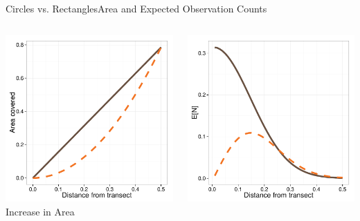 \documentclass{beamer}
\begin{document}
\begin{frame}{Circles vs. Rectangles}{Area and Expected Observation Counts}
	\begin{columns}
		\begin{column}{0.48\textwidth}
		\centering
		\includegraphics[width=\textwidth]{../images/rect-circ-area.pdf}\\
		\small
		Increase in Area
		\end{column}
		\begin{column}{0.48\textwidth}
		\centering
		\includegraphics[width=\textwidth]{../images/rect-circ-detection.pdf}\\

\end{column}
\end{columns}
\end{frame}
\end{document}
